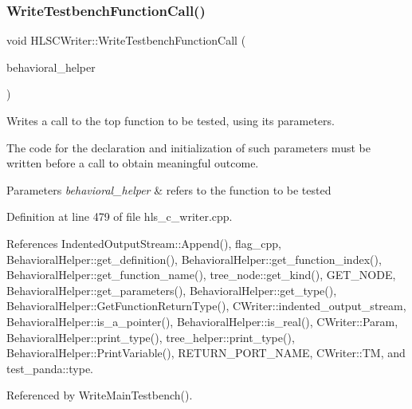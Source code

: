 \subsubsection{\texorpdfstring{Write\+Testbench\+Function\+Call()}{WriteTestbenchFunctionCall()}}
{\footnotesize\ttfamily void H\+L\+S\+C\+Writer\+::\+Write\+Testbench\+Function\+Call (\begin{DoxyParamCaption}\item[{const \hyperlink{behavioral__helper_8hpp_aae973b54cac87eef3b27442aa3e1e425}{Behavioral\+Helper\+Const\+Ref}}]{behavioral\+\_\+helper }\end{DoxyParamCaption})\hspace{0.3cm}{\ttfamily [protected]}}



Writes a call to the top function to be tested, using its parameters. 

The code for the declaration and initialization of such parameters must be written before a call to obtain meaningful outcome. 
\begin{DoxyParams}{Parameters}
{\em behavioral\+\_\+helper} & refers to the function to be tested \\
\hline
\end{DoxyParams}


Definition at line 479 of file hls\+\_\+c\+\_\+writer.\+cpp.



References Indented\+Output\+Stream\+::\+Append(), flag\+\_\+cpp, Behavioral\+Helper\+::get\+\_\+definition(), Behavioral\+Helper\+::get\+\_\+function\+\_\+index(), Behavioral\+Helper\+::get\+\_\+function\+\_\+name(), tree\+\_\+node\+::get\+\_\+kind(), G\+E\+T\+\_\+\+N\+O\+DE, Behavioral\+Helper\+::get\+\_\+parameters(), Behavioral\+Helper\+::get\+\_\+type(), Behavioral\+Helper\+::\+Get\+Function\+Return\+Type(), C\+Writer\+::indented\+\_\+output\+\_\+stream, Behavioral\+Helper\+::is\+\_\+a\+\_\+pointer(), Behavioral\+Helper\+::is\+\_\+real(), C\+Writer\+::\+Param, Behavioral\+Helper\+::print\+\_\+type(), tree\+\_\+helper\+::print\+\_\+type(), Behavioral\+Helper\+::\+Print\+Variable(), R\+E\+T\+U\+R\+N\+\_\+\+P\+O\+R\+T\+\_\+\+N\+A\+ME, C\+Writer\+::\+TM, and test\+\_\+panda\+::type.



Referenced by Write\+Main\+Testbench().

